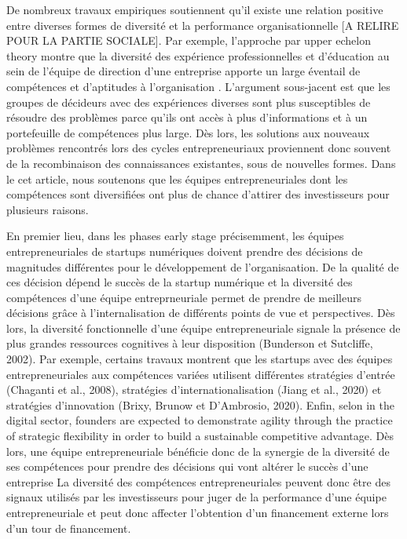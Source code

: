 \documentclass[12pt]{article}
\begin{document}
De nombreux travaux empiriques soutiennent qu'il existe une relation positive entre diverses formes de diversité et la performance organisationnelle \citep{zhou2015entrepreneurial} [A RELIRE POUR LA PARTIE SOCIALE]. Par exemple, l'approche par upper echelon theory montre que la diversité des expérience professionnelles et d'éducation au sein de l'équipe de direction d'une entreprise apporte un large éventail de compétences et d'aptitudes à l'organisation \citep{beckman2007early, hambrick1984upper}. L'argument sous-jacent est que les groupes de décideurs avec des expériences diverses sont plus susceptibles de résoudre des problèmes parce qu'ils ont accès à plus d'informations et à un portefeuille de compétences plus large. Dès lors, les solutions aux nouveaux problèmes rencontrés lors des cycles entrepreneuriaux proviennent donc souvent de la recombinaison des connaissances existantes, sous de nouvelles formes. Dans le cet article, nous soutenons que les équipes entrepreneuriales dont les compétences sont diversifiées ont plus de chance d'attirer des investisseurs pour plusieurs raisons.

En premier lieu, dans les phases early stage précisemment, les équipes entrepreneuriales de startups numériques doivent prendre des décisions de magnitudes différentes pour le développement de l'organisaation. De la qualité de ces décision dépend le succès de la startup numérique et la diversité des compétences d'une équipe entreprneuriale permet de prendre de meilleurs décisions grâce à l'internalisation de différents points de vue et perspectives. Dès lors, la diversité fonctionnelle d'une équipe entrepreneuriale signale la présence de plus grandes ressources cognitives à leur disposition (Bunderson et Sutcliffe, 2002). Par exemple, certains travaux montrent que les startups avec des équipes entrepreneuriales aux compétences variées utilisent différentes stratégies d'entrée (Chaganti et al., 2008), stratégies d'internationalisation (Jiang et al., 2020) et stratégies d'innovation (Brixy, Brunow et D'Ambrosio, 2020). Enfin, selon \citep{subramanian2022backing} in the digital sector, founders are expected to demonstrate agility through the practice of strategic flexibility in order to build a sustainable competitive advantage. Dès lors, une équipe entrepreneuriale bénéficie donc de la synergie de la diversité de ses compétences pour prendre des décisions qui vont altérer le succès d'une entreprise La diversité des compétences entrepreneuriales peuvent donc être des signaux utilisés par les investisseurs pour juger de la performance d'une équipe entrepreneuriale et peut donc affecter l'obtention d'un financement externe lors d'un tour de financement.
\end{document}
